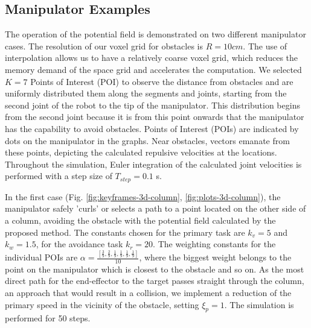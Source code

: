 \documentclass[letterpaper, 10 pt, conference]{ieeeconf}  %
\begin{document}

\subsection{Manipulator Examples}

The operation of the potential field is demonstrated on two different manipulator cases. The resolution of our voxel grid for obstacles is \( R=10cm \). The use of interpolation allows us to have a relatively coarse voxel grid, which reduces the memory demand of the space grid and accelerates the computation. We selected \( K = 7 \) Points of Interest (POI) to observe the distance from obstacles and are uniformly distributed them along the segments and joints, starting from the second joint of the robot to the tip of the manipulator. This distribution begins from the second joint because it is from this point onwards that the manipulator has the capability to avoid obstacles. Points of Interest (POIs) are indicated by dots on the manipulator in the graphs. Near obstacles, vectors emanate from these points, depicting the calculated repulsive velocities at the locations. Throughout the simulation, Euler integration of the calculated joint velocities is performed with a step size of \( T_{step} = 0.1 \) s.

In the first case (Fig. \ref{fig:keyframes-3d-column}, \ref{fig:plots-3d-column}), the manipulator safely 'curls' or selects a path to a point located on the other side of a column, avoiding the obstacle with the potential field calculated by the proposed method. The constants chosen for the primary task are \( k_v = 5 \) and \( k_w = 1.5 \), for the avoidance task \(k_r=20\). The weighting constants for the individual POIs are \( \alpha = \frac{[ \frac{3}{9}, \frac{2}{9}, \frac{1}{9}, \frac{1}{9}, \frac{1}{9}, \frac{1}{9} ]}{10} \), where the biggest weight belongs to the point on the manipulator which is closest to the obstacle and so on. As the most direct path for the end-effector to the target passes straight through the column, an approach that would result in a collision, we implement a reduction of the primary speed in the vicinity of the obstacle, setting \( \xi_{p} = 1 \). The simulation is performed for 50 steps. 
\end{document}
